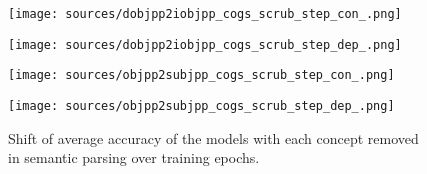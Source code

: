 \begin{figure}[t]
    \centering
    \begin{minipage}[b]{0.49\linewidth}
    \centering
    \texttt{[image: sources/dobjpp2iobjpp\_cogs\_scrub\_step\_con\_.png]}
    \end{minipage}
    \begin{minipage}[b]{0.49\linewidth}
    \centering
    \texttt{[image: sources/dobjpp2iobjpp\_cogs\_scrub\_step\_dep\_.png]}
    \end{minipage}
    \begin{minipage}[b]{0.49\linewidth}
    \centering
    \texttt{[image: sources/objpp2subjpp\_cogs\_scrub\_step\_con\_.png]}
    \end{minipage}
    \begin{minipage}[b]{0.49\linewidth}
    \centering
    \texttt{[image: sources/objpp2subjpp\_cogs\_scrub\_step\_dep\_.png]}
    \end{minipage}
    \caption{Shift of average accuracy of the models with each concept removed in semantic parsing over training epochs.}
    \label{fig:results_causal_epoch_other}
\end{figure}
